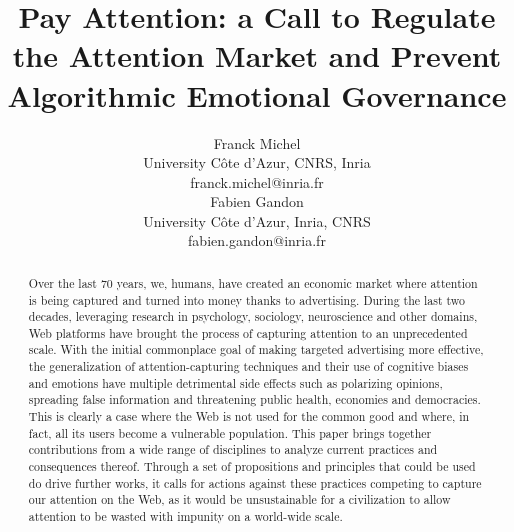 \documentclass[10pt]{article}
\title{Pay Attention: a Call to Regulate the Attention Market and Prevent Algorithmic Emotional Governance}
\author{Franck Michel \\
  University Côte d'Azur, CNRS, Inria \\
  { franck.michel@inria.fr} \\\And
  Fabien Gandon \\
  University Côte d'Azur, Inria, CNRS \\
  { fabien.gandon@inria.fr} \\}
\date{}
\begin{document}
\maketitle
\begin{abstract}
Over the last 70 years, we, humans, have created an economic market where attention is being captured and turned into money thanks to advertising. During the last two decades, leveraging research in psychology, sociology, neuroscience and other domains, Web platforms have brought the process of capturing attention to an unprecedented scale.
With the initial commonplace goal of making targeted advertising more effective, the generalization of attention-capturing techniques and their use of cognitive biases and emotions have multiple detrimental side effects such as polarizing opinions, spreading false information and threatening public health, economies and democracies. This is clearly a case where the Web is not used for the common good and where, in fact, all its users become a vulnerable population.
This paper brings together contributions from a wide range of disciplines to analyze current practices and consequences thereof. Through a set of propositions and principles that could be used do drive further works, it calls for actions against these practices competing to capture our attention on the Web, as it would be unsustainable for a civilization to allow attention to be wasted with impunity on a world-wide scale.
\end{abstract}
\end{document}
